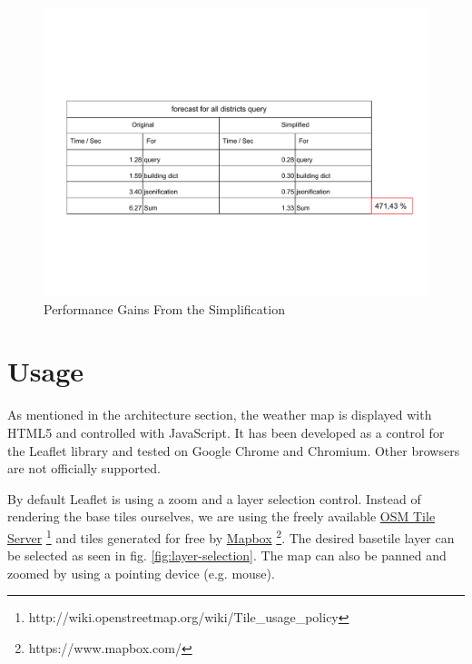 \documentclass[paper=a4, fontsize=11pt]{article} %
\numberwithin{equation}{section} %
\numberwithin{figure}{section} %
\numberwithin{table}{section} %
\begin{document}
\begin{figure}[htbp]
	\centering
	\includegraphics[trim = 0mm 0mm 0mm 0mm, clip, width=1.1\textwidth]{pictures/simplification_table}
	\caption{Performance Gains From the Simplification}
	\label{simplification_table}
\end{figure}


\section{Usage}\label{usage}

As mentioned in the architecture section, the weather map is displayed
with HTML5 and controlled with JavaScript. It has been developed as a
control for the Leaflet library and tested on Google Chrome and
Chromium. Other browsers are not officially supported.

By default Leaflet is using a zoom and a layer selection control.
Instead of rendering the base tiles ourselves, we are using the freely
available \href{http://wiki.openstreetmap.org/wiki/Tile_usage_policy}{OSM Tile Server} \footnote{http://wiki.openstreetmap.org/wiki/Tile\_usage\_policy} and tiles generated for free by
\href{https://www.mapbox.com/}{Mapbox} \footnote{https://www.mapbox.com/}. The desired basetile layer can be selected as seen in fig. \ref{fig:layer-selection}.
The map can also be panned and zoomed by using a pointing device
(e.g. mouse).
\end{document}

